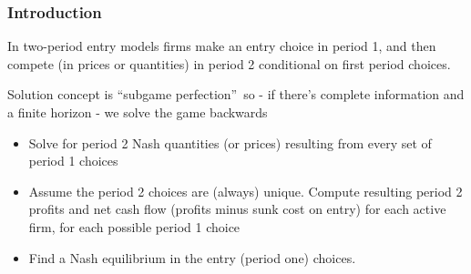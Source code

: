 \begin{frame}%

\frametitle{Introduction}

In two-period entry models firms make an entry choice in period 1, and then
compete (in prices or quantities) in period 2 conditional on first period
choices.

Solution concept is \textquotedblleft subgame perfection\textquotedblright\
so - if there's complete information and a finite horizon - we solve the
game backwards

\begin{itemize}
\item Solve for period 2 Nash quantities (or prices) resulting from every
set of period 1 choices

\item Assume the period 2 choices are (always) unique. Compute resulting
period 2 profits and net cash flow (profits minus sunk cost on entry) for
each active firm, for each possible period 1 choice

\item Find a Nash equilibrium in the entry (period one) choices.
\end{itemize}

\end{frame}%

